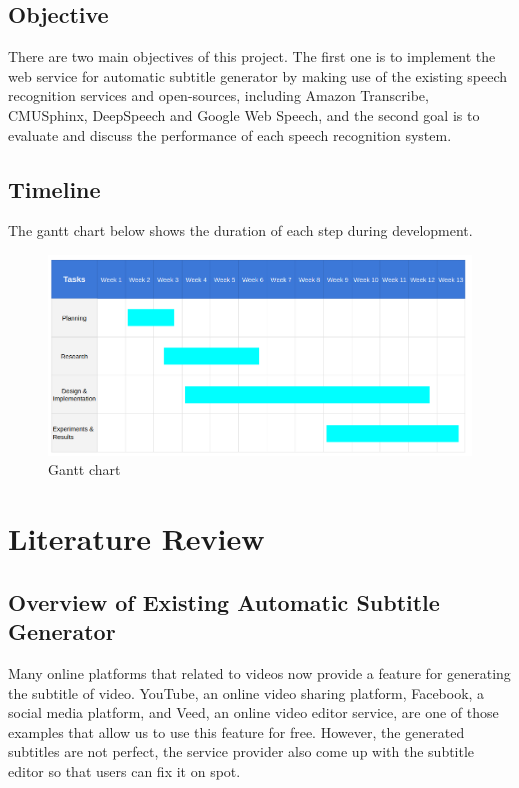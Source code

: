 \documentclass[natbib]{muthesis}
\begin{document}
  \section{Objective}
  There are two main objectives of this project. The first one is to implement the web service for automatic subtitle generator by making use of the existing speech recognition services and open-sources, including Amazon Transcribe, CMUSphinx, DeepSpeech and Google Web Speech, and the second goal is to evaluate and discuss the performance of each speech recognition system.
  
  \section{Timeline}
  The gantt chart below shows the duration of each step during development.
    \begin{figure}[H]
  	\centering
  	\captionsetup{justification=centering}
  	\includegraphics[width=0.9\linewidth]{images/gantt-chart}
  	\caption{Gantt chart}
  	\label{fig:gantt-chart}
  \end{figure}
  
  \chapter{Literature Review}
  
  \section{Overview of Existing Automatic Subtitle Generator}
  Many online platforms that related to videos now provide a feature for generating the subtitle of video. YouTube, an online video sharing platform, Facebook, a social media platform, and Veed, an online video editor service, are one of those examples that allow us to use this feature for free. However, the generated subtitles are not perfect, the service provider also come up with the subtitle editor so that users can fix it on spot.
  
\end{document}
